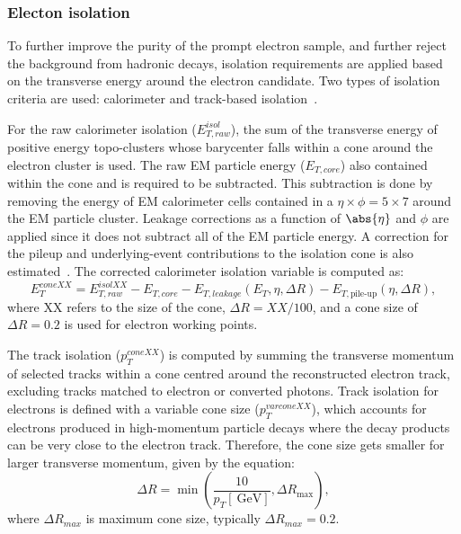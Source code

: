 \subsubsection{Electon isolation}
To further improve the purity of the prompt electron sample, and further reject the background from hadronic decays, isolation requirements are applied based on the transverse energy around the electron candidate. Two types of isolation criteria are used: calorimeter and track-based isolation~\cite{Aad:2019tso}.

For the raw calorimeter isolation ($E_{T,raw}^{isol}$), the sum of the transverse energy of positive energy topo-clusters whose barycenter falls within a cone around the electron cluster is used. The raw EM particle energy ($E_{T,core}$) also contained within the cone and is required to be subtracted. This subtraction is done by removing the energy of EM calorimeter cells contained in a $\eta \times \phi = 5 \times 7$ around the EM particle cluster. Leakage corrections as a function of $\abs{\eta}$ and $\phi$ are applied since it does not subtract all of the EM particle energy. A correction for the pileup and underlying-event contributions to the isolation cone is also estimated~\cite{Cacciari:2007fd}. The corrected calorimeter isolation variable is computed as:
\begin{equation}
    E_{T}^{coneXX} = E_{T,raw}^{isolXX} - E_{T,core} - E_{T,leakage}(E_T,\eta,\Delta R) - E_{{T,\textrm{pile-up}}}(\eta,\Delta R),
\end{equation}
where XX refers to the size of the cone, $\Delta R = XX/100$, and a cone size of $\Delta R = 0.2$ is used for electron working points.  

The track isolation ($p_{T}^{coneXX}$) is computed by summing the transverse momentum of selected tracks within a cone centred around the reconstructed electron track, excluding tracks matched to electron or converted photons. Track isolation for electrons is defined with a variable cone size ($p_{T}^{varconeXX}$), which accounts for electrons produced in high-momentum particle decays where the decay products can be very close to the electron track. Therefore, the cone size gets smaller for larger transverse momentum, given by the equation: 
\begin{equation}
    \Delta R = \min \left( \frac{10}{p_T[\SI{}{\giga\electronvolt}]}, \Delta R_{\mathrm{max}}\right),
\end{equation}
where $\Delta R_{max}$ is maximum cone size, typically $\Delta R_{max} = 0.2$. 

